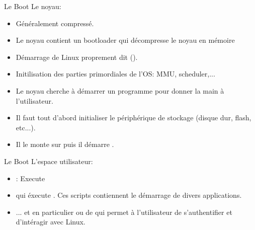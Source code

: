 \begin{frame}[fragile=singleslide]{Le Boot}
  Le noyau:
  \begin{itemize}
  \item Généralement compressé.
  \item Le  noyau contient un  bootloader qui décompresse le  noyau en
    mémoire
  \item       Démarrage       de       Linux      proprement       dit
    ().
  \item   Initilisation  des  parties   primordiales  de   l'OS:  MMU,
    scheduler,...
  \item Le noyau cherche à démarrer un programme pour donner la main à
    l'utilisateur.
  \item Il  faut tout d'abord initialiser le  périphérique de stockage
    (disque dur, flash, etc...).
  \item Il le monte sur \file{/} puis il démarre .
  \end{itemize}
\end{frame}

\begin{frame}[fragile=singleslide]{Le Boot}
  L'espace utilisateur:
  \begin{itemize}
  \item {}:  Execute 
  \item qui  éxecute .  Ces  scripts contiennent le
    démarrage de divers applications.
  \item  ...  et  en  particulier   ou  de   qui
    permet  à  l'utilisateur  de  s'authentifier et  d'intéragir  avec
    Linux.
  \end{itemize}
\end{frame}

